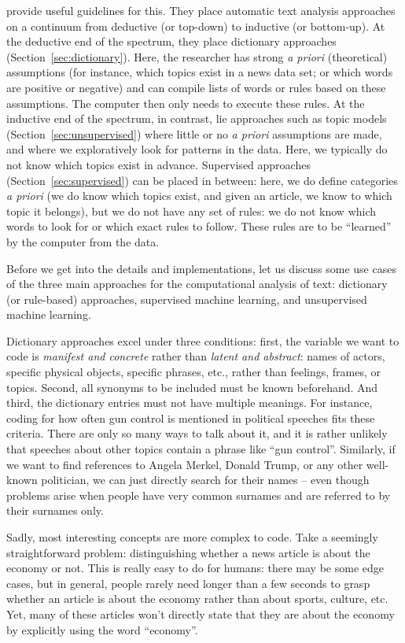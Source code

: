 \cite{Boumans2016} provide useful guidelines for this. They place
automatic text analysis approaches on a continuum from deductive (or
top-down) to inductive (or bottom-up). At the deductive end of the
spectrum, they place dictionary approaches
(Section~\ref{sec:dictionary}). Here, the researcher has strong \emph{a priori}
(theoretical) assumptions (for instance, which topics exist in a news
data set; or which words are positive or negative) and can compile
lists of words or rules based on these assumptions. The computer then
only needs to execute these rules. At the inductive end of the
spectrum, in contrast, lie approaches such as topic models
(Section~\ref{sec:unsupervised}) where little or no \emph{a priori} assumptions are
made, and where we exploratively look for patterns in the data. Here,
we typically do not know which topics exist in advance. Supervised
approaches (Section~\ref{sec:supervised}) can be placed in between: here, we do
define categories \emph{a priori} (we do know which topics exist, and given
an article, we know to which topic it belongs), but we do not have
any set of rules: we do not know which words to look for or which
exact rules to follow. These rules are to be ``learned'' by the computer
from the data.

Before we get into the details and implementations, let us discuss some
use cases of the three main approaches for the
computational analysis of text: dictionary (or rule-based) approaches,
supervised machine learning, and unsupervised machine learning.

Dictionary approaches excel under three conditions: first, the
variable we want to code is \emph{manifest and concrete} rather than
\emph{latent and abstract}: names of actors, specific physical
objects, specific phrases, etc., rather than feelings, frames, or
topics. Second, all synonyms to be included must be known
beforehand. And third, the dictionary entries must not have multiple
meanings.
For instance, coding for how often gun control is mentioned in political
speeches fits these criteria. There are only so many ways to talk
about it, and it is rather unlikely that speeches about other topics
contain a phrase like ``gun control''. Similarly, if we want to find
references to Angela Merkel, Donald Trump, or any other well-known
politician, we can just directly search for their names -- even though
problems arise when people have very common surnames and are referred
to by their surnames only.

Sadly, most interesting concepts are more complex to code. Take a
seemingly straightforward problem: distinguishing whether a news
article is about the economy or not. This is really easy to do for
humans: there may be some edge cases, but in general, people rarely
need longer than a few seconds to grasp whether an article is about the
economy rather than about sports, culture, etc. Yet, many of these
articles won't directly state that they are about the economy by
explicitly using the word ``economy''.

